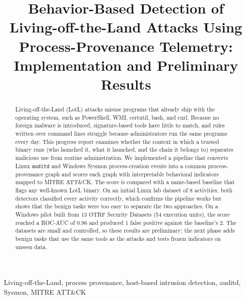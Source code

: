 \documentclass[conference]{IEEEtran}
\newcommand{\LinTotal}{8}
\newcommand{\WinTotal}{54}
\newcommand{\WinBaseFP}{2}
\newcommand{\WinScoreFP}{1}
\newcommand{\WinAUC}{0.96}
\begin{document}
\title{Behavior-Based Detection of Living-off-the-Land Attacks Using Process-Provenance Telemetry: Implementation and Preliminary Results}

\author{
}

\maketitle

\begin{abstract}
Living-off-the-Land (LotL) attacks misuse programs that already ship with
the operating system, such as PowerShell, WMI, certutil, bash, and curl.
Because no foreign malware is introduced, signature-based tools have little
to match, and rules written over command lines struggle because
administrators run the same programs every day. This progress report
examines whether the context in which a trusted binary runs (who launched
it, what it launched, and the chain it belongs to) separates malicious use
from routine administration. We implemented a pipeline that converts Linux
\texttt{auditd} and Windows Sysmon process-creation events into a common
process-provenance graph and scores each graph with interpretable behavioral
indicators mapped to MITRE ATT\&CK. The score is compared with a name-based
baseline that flags any well-known LotL binary. On an initial Linux lab
dataset of \LinTotal{} activities, both detectors classified every activity
correctly, which confirms the pipeline works but shows that the benign tasks
were too easy to separate the two approaches. On a Windows pilot built from
13 OTRF Security Datasets (\WinTotal{} execution units), the score reached a
ROC-AUC of \WinAUC{} and produced \WinScoreFP{} false positive against the
baseline's \WinBaseFP{}. The datasets are small and controlled, so these
results are preliminary; the next phase adds benign tasks that use the same
tools as the attacks and tests frozen indicators on unseen data.
\end{abstract}

\begin{IEEEkeywords}
Living-off-the-Land, process provenance, host-based intrusion detection, auditd, Sysmon, MITRE ATT\&CK
\end{IEEEkeywords}

\end{document}
